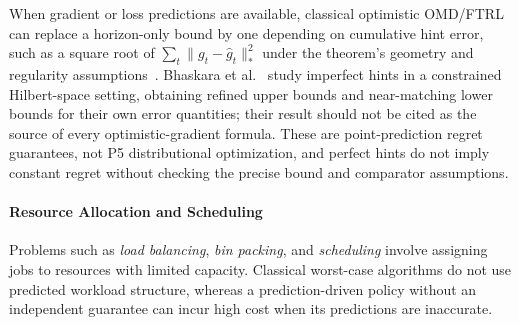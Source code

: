 \documentclass[acmsmall,screen,nonacm]{acmart}
\theoremstyle{acmdefinition}%
\begin{document}
When gradient or loss predictions are available, classical optimistic OMD/FTRL can replace a horizon-only bound by one depending on cumulative hint error, such as a square root of $\sum_t\|g_t-\hat g_t\|_*^2$ under the theorem's geometry and regularity assumptions~\cite{rakhlin2013predictable}. Bhaskara et al.~\cite{bhaskara2020hints} study imperfect hints in a constrained Hilbert-space setting, obtaining refined upper bounds and near-matching lower bounds for their own error quantities; their result should not be cited as the source of every optimistic-gradient formula. These are point-prediction regret guarantees, not P5 distributional optimization, and perfect hints do not imply constant regret without checking the precise bound and comparator assumptions.

\paragraph{Resource Allocation and Scheduling}
Problems such as \emph{load balancing}, \emph{bin packing}, and \emph{scheduling} involve assigning jobs to resources with limited capacity. Classical worst-case algorithms do not use predicted workload structure, whereas a prediction-driven policy without an independent guarantee can incur high cost when its predictions are inaccurate.
\end{document}
